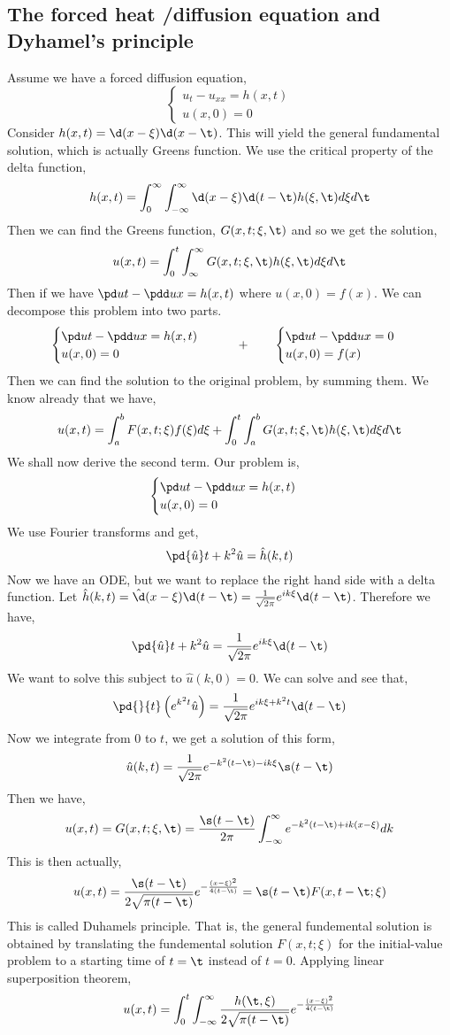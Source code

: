 \noindent
\subsection{The forced heat /diffusion equation and Dyhamel's principle}
Assume we have a forced diffusion equation,
$$ \begin{cases}
  u_t - u_{xx} = h(x, t)\\
  u(x, 0) = 0
\end{cases} $$
Consider $h(x, t) = \d(x - \xi)\d(x - \t)$. This will yield the general fundamental solution, which is actually Greens function. We use the critical property of the delta function,
$$ h(x, t) = \int_0^\infty \int_{-\infty}^\infty \d(x - \xi)\d(t - \t)h(\xi, \t)d\xi d\t $$
Then we can find the Greens function, $G(x, t; \xi, \t)$ and so we get the solution,
$$ u(x, t) = \int_0^t \int_{\infty}^\infty G(x, t; \xi, \t) h(\xi, \t)d\xi d\t $$
Then if we have $\pd u t - \pdd u x = h(x, t)$ where $u(x, 0) = f(x)$. We can decompose this problem into two parts.
$$ \begin{cases}
  \pd u t - \pdd u x = h(x, t) \\
  u(x, 0) = 0
\end{cases} \qquad + \qquad \begin{cases}
  \pd u t - \pdd u x = 0 \\
  u(x, 0) = f(x)
\end{cases}$$
Then we can find the solution to the original problem, by summing them. We know already that we have,
$$ u(x, t) = \int_a^b F(x, t; \xi) f(\xi) d\xi + \int_0^t \int_a^b G(x, t; \xi, \t)h(\xi, \t) d\xi d\t$$
We shall now derive the second term. Our problem is,
$$ \begin{cases}
  \pd u t - \pdd u x = h(x, t) \\
  u(x, 0) = 0
\end{cases} $$
We use Fourier transforms and get,
$$ \pd {\hat u} t + k^2\hat u = \hat h(k, t) $$
Now we have an ODE, but we want to replace the right hand side with a delta function. Let $\hat h(k, t) = \hat \d (x - \xi) \d ( t - \t) = \frac{1}{\sqrt{2\pi}} e^{ik\xi}\d ( t - \t)$. Therefore we have,
$$ \pd {\hat u} t + k^2\hat u = \frac{1}{\sqrt{2\pi}} e^{ik\xi}\d ( t - \t) $$
We want to solve this subject to $\hat u (k, 0) = 0$. We can solve and see that,
$$ \pd{}{t}\left( e^{k^2t}\hat u \right) = \frac{1}{\sqrt{2\pi}} e^{ik\xi + k^2t} \d(t - \t) $$
Now we integrate from $0$ to $t$, we get a solution of this form,
$$ \hat u(k, t) = \frac{1}{\sqrt{2\pi}}e^{-k^2(t - \t) - ik\xi} \s(t - \t) $$
Then we have,
$$ u(x, t) = G(x, t; \xi, \t) = \frac{\s(t - \t)}{2\pi}\int_{-\infty}^\infty e^{-k^2(t - \t) + ik(x - \xi)}dk $$
This is then actually,
$$ u(x, t) = \frac{\s(t - \t)}{2\sqrt{\pi ( t - \t)}}e^{-\frac{(x - \xi)^2}{4(t - \t)}} = \s(t - \t)F(x, t - \t; \xi) $$
This is called Duhamels principle. That is, the general fundemental solution is obtained by translating the fundemental solution $F(x, t; \xi)$ for the initial-value problem to a starting time of $t = \t$ instead of $t = 0$. Applying linear superposition theorem,
$$ u(x, t) = \int_0^t \int_{-\infty}^\infty \frac{h(\t, \xi)}{2\sqrt{\pi(t - \t)}}e^{-\frac{(x - \xi)^2}{4(t - \t)}} $$

